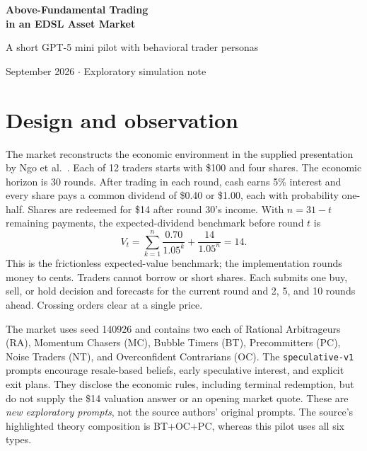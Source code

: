 \documentclass[11pt,letterpaper]{article}
\newcommand{\code}[1]{\texttt{\small #1}}
\begin{document}
\begin{center}
{\LARGE\bfseries\color{ink} Above-Fundamental Trading\\[3pt] in an EDSL Asset Market}\par
\vspace{5pt}
{\large A short GPT-5 mini pilot with behavioral trader personas}\par
{\small September 2026 \quad $\cdot$ \quad Exploratory simulation note}
\end{center}

\begin{abstract}
Twelve LLM traders interacted through a persistent, sealed-order call market.
With newly authored speculative prompts and GPT-5 mini, the first transactions
occurred in rounds 16 and 17 at \$17.53 and \$17.67, respectively, against a
constant \$14 fundamental value. Volume was 2 and 19 shares. The observation
then stopped under a two-consecutive-prices rule. This is evidence of early
above-fundamental trading in one market; the two observed price points do not
establish a full bubble-and-crash path. EDSL elicited all 204 trader decisions;
shared-state commands performed the 17 settlements deterministically.
\end{abstract}

\section{Design and observation}
The market reconstructs the economic environment in the supplied presentation
by Ngo et al.\ \cite{ngo}. Each of 12 traders starts with \$100 and four shares.
The economic horizon is 30 rounds. After trading in each round, cash earns 5\%
interest and every share pays a common dividend of \$0.40 or \$1.00, each with
probability one-half. Shares are redeemed for \$14 after round 30's income.
With $n=31-t$ remaining payments, the expected-dividend benchmark before round
$t$ is
\[
 V_t=\sum_{k=1}^{n}\frac{0.70}{1.05^k}+\frac{14}{1.05^n}=14.
\]
This is the frictionless expected-value benchmark; the implementation rounds
money to cents. Traders cannot borrow or short shares. Each submits one buy,
sell, or hold decision and forecasts for the current round and 2, 5, and 10
rounds ahead. Crossing orders clear at a single price.

The market uses seed 140926 and contains two each of Rational Arbitrageurs (RA), Momentum
Chasers (MC), Bubble Timers (BT), Precommitters (PC), Noise Traders (NT), and
Overconfident Contrarians (OC). The \code{speculative-v1} prompts encourage
resale-based beliefs, early speculative interest, and explicit exit plans.
They disclose the economic rules, including terminal redemption, but do not
supply the \$14 valuation answer or an opening market quote. These are
\emph{new exploratory prompts}, not the source authors' original prompts.
The source's highlighted theory composition is BT+OC+PC, whereas this pilot
uses all six types.
\end{document}
